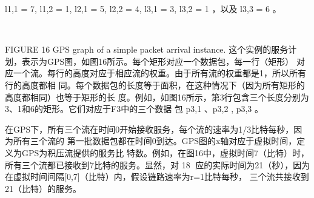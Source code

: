 l1,1 = 7, l1,2 = 1, l2,1 = 5, l2,2 = 4, l3,1 = 3, l3,2 = 1 ，以及 l3,3 = 6 。
       ​       ​               ​         ​       ​       ​                ​




   ​               ​               ​         ​       ​        ​                ​




                               FIGURE 16 GPS graph of a simple packet arrival instance.
这个实例的服务计划，表示为GPS图，如图16所示。每个矩形对应一个数据包，每一行（矩形）
对应一个流。每行的高度对应于相应流的权重。由于所有流的权重都是1，所以所有行的高度都相
同。每个数据包的长度等于面积，在这种情况下（因为所有矩形的高度都相同）也等于矩形的长
度。例如，如图16所示，第3行包含三个长度分别为3、1和6的矩形。它们对应于F3中的三个数据
包 p3,1 、p3,2 , p3,3 。
           ​           ​   ​




在GPS下，所有三个流在时间0开始接收服务，每个流的速率为1/3比特每秒，因为所有三个流的
第一批数据包都在时间0到达。GPS图的x轴对应于虚拟时间，定义为GPS为积压流提供的服务比
特数。例如，在图16中，虚拟时间7（比特）时，所有三个流都已接收到7比特的服务。显然，对
                                                                                              18
应的实际时间为21（秒），因为在虚拟时间间隔[0,7]（比特）内，假设链路速率为r=1比特每秒，
三个流共接收到21（比特）的服务。

